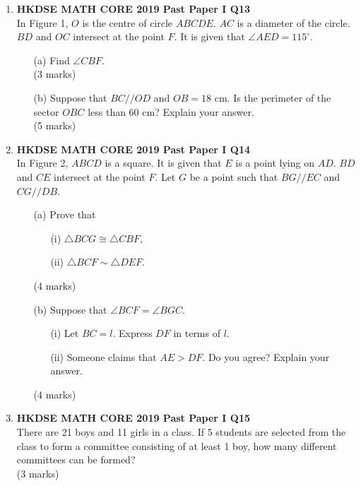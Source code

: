 \documentclass[12pt]{article}
\begin{document}
\begin{enumerate}
	\item \textbf{HKDSE MATH CORE 2019 Past Paper I Q13}\\
	In Figure 1, $O$ is the centre of circle $ABCDE$. $AC$ is a diameter of the circle. $BD$ and $OC$ intersect at the point $F$. It is given that $\angle AED = 115^\circ$.
	\begin{enumerate}
		\item[(a)] Find $\angle CBF$. \\(3 marks)
		\item[(b)] Suppose that $BC//OD$ and $OB = 18$ cm. Is the perimeter of the sector $OBC$ less than 60 cm? Explain your answer. \\(5 marks)
	\end{enumerate}

	\item \textbf{HKDSE MATH CORE 2019 Past Paper I Q14}\\
	In Figure 2, $ABCD$ is a square. It is given that $E$ is a point lying on $AD$. $BD$ and $CE$ intersect at the point $F$. Let $G$ be a point such that $BG // EC$ and $CG // DB$.
	\begin{enumerate}
		\item [(a)] Prove that 
		\begin{enumerate}
			\item[(i)] $\triangle BCG \cong \triangle CBF$,
			\item[(ii)] $\triangle BCF \sim \triangle DEF$.
		\end{enumerate}
		(4 marks)
		\item[(b)] Suppose that $\angle BCF = \angle BGC$.
		\begin{enumerate}
			\item [(i)] Let $BC = l$. Express $DF$ in terms of $l$.
			\item[(ii)] Someone claims that $AE > DF$. Do you agree? Explain your answer.
		\end{enumerate}
		(4 marks)
	\end{enumerate}

	\item \textbf{HKDSE MATH CORE 2019 Past Paper I Q15}\\
	There are 21 boys and 11 girls in a class. If 5 students are selected from the class to form a committee consisting of at least 1 boy, how many different committees can be formed?	 \\(3 marks)


\end{enumerate}
\end{document}
